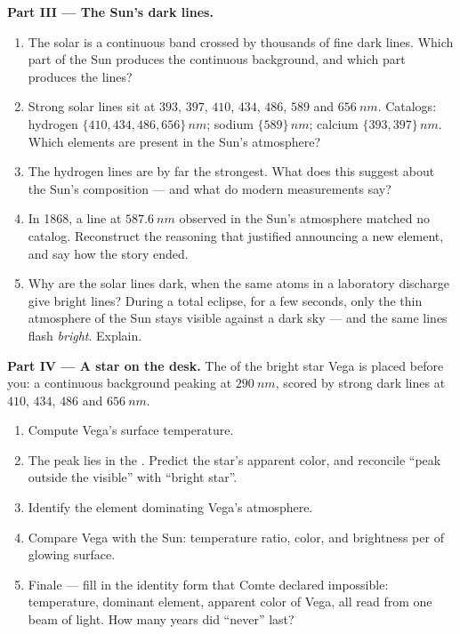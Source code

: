 \begin{problem}
\medskip
\noindent\textbf{Part III --- The Sun's dark lines.}
\begin{enumerate}[resume]
  \item The solar  is a continuous band crossed by thousands of
        fine dark lines. Which part of the Sun produces the continuous
        background, and which part produces the lines?
  \item Strong solar lines sit at $393$, $397$, $410$, $434$, $486$,
        $589$ and $\qty{656}{nm}$. Catalogs: hydrogen
        $\{410, 434, 486, 656\}\,\unit{nm}$; sodium $\{589\}\,\unit{nm}$;
        calcium $\{393, 397\}\,\unit{nm}$. Which elements are present in
        the Sun's atmosphere?
  \item The hydrogen lines are by far the strongest. What does this
        suggest about the Sun's composition --- and what do modern
        measurements say?
  \item In 1868, a line at $\qty{587.6}{nm}$ observed in the Sun's
        atmosphere matched no catalog. Reconstruct the reasoning that
        justified announcing a new element, and say how the story ended.
  \item Why are the solar lines dark, when the same atoms in a
        laboratory discharge give bright lines? During a total eclipse,
        for a few seconds, only the thin atmosphere of the Sun stays
        visible against a dark sky --- and the same lines flash
        \emph{bright}. Explain.
\end{enumerate}

\medskip
\noindent\textbf{Part IV --- A star on the desk.}
The  of the bright star Vega is placed before you: a continuous
background peaking at $\qty{290}{nm}$, scored by strong dark lines at
$410$, $434$, $486$ and $\qty{656}{nm}$.
\begin{enumerate}[resume]
  \item Compute Vega's surface temperature.
  \item The peak lies in the . Predict the star's apparent
        color, and reconcile ``peak outside the visible'' with ``bright
        star''.
  \item Identify the element dominating Vega's atmosphere.
  \item Compare Vega with the Sun: temperature ratio, color, and
        brightness per  of glowing surface.
  \item Finale --- fill in the identity form that Comte declared
        impossible: temperature, dominant element, apparent color of
        Vega, all read from one beam of light. How many years did
        ``never'' last?
\end{enumerate}
\end{problem}
